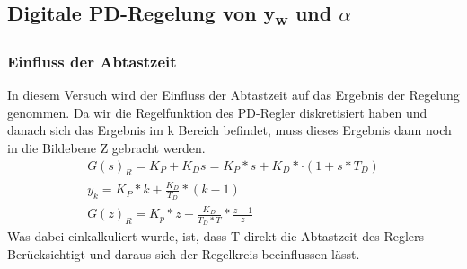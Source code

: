 \documentclass[10pt]{scrartcl}
\begin{document}
\subsection{Digitale PD-Regelung von  y\textsubscript{w} und $\alpha$}
\subsubsection{Einfluss der Abtastzeit}

In diesem Versuch wird der Einfluss der Abtastzeit auf das Ergebnis der Regelung genommen. Da wir die Regelfunktion des PD-Regler diskretisiert haben und danach sich das Ergebnis im k Bereich befindet, muss dieses Ergebnis dann noch in die Bildebene Z gebracht werden. 
\begin{align}
   G(s)_R = K_P + K_D s = K_P *s + K_D *·(1 + s *T_D)  \\
   y_k= K_P * k+ \frac{K_D}{T_D} *( k - 1 )  \\
   G(z)_R = K_p * z + \frac{K_D}{T_D*T} *\frac{z-1}{z}
\end{align}
Was dabei einkalkuliert wurde, ist, dass T direkt die Abtastzeit des Reglers Berücksichtigt und daraus sich der Regelkreis beeinflussen lässt.
\end{document}
